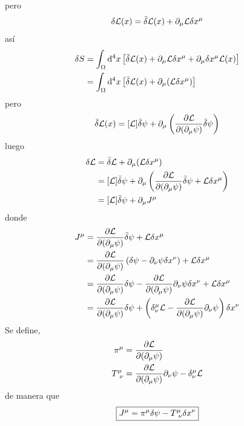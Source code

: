 pero
\begin{equation}
  \delta\mathcal{L}(x)=\bar{\delta}\mathcal{L}(x)+\partial_\mu \mathcal{L}\delta x^\mu 
\end{equation}
así
\begin{align}
  \delta S&=\int_\Omega\dd^4x\left[\bar{\delta}\mathcal{L}(x)+\partial_\mu \mathcal{L}\delta x^\mu +\partial_\mu \delta x^\mu \mathcal{L}(x)\right]\\
  &=\int_\Omega\dd^4x \left[\bar{\delta} \mathcal{L}(x)+\partial_\mu (\mathcal{L} \delta x^\mu )\right]
\end{align}
pero
\begin{align}
  \bar{\delta} \mathcal{L}(x)=[\mathcal{L} ]\bar{\delta}\psi +\partial_\mu \left(\pdv{\mathcal{L}}{(\partial_\mu\psi)}\bar{\delta} \psi\right)
\end{align}
luego
\begin{align}
  \delta\mathcal{L} &=\bar{\delta} \mathcal{L} +\partial_\mu (\mathcal{L} \delta x^\mu )\\
  &=[\mathcal{L} ]\bar{\delta}\psi+\partial_\mu \left(\pdv{\mathcal{L}}{(\partial_\mu\psi)}\bar{\delta} \psi+\mathcal{L} \delta x^\mu\right)\\
  &=[\mathcal{L} ]\bar{\delta} \psi +\partial_\mu J^\mu 
\end{align}
donde 
\begin{align}
  J^\mu &=\pdv{\mathcal{L}}{(\partial_\mu\psi)}\bar{\delta} \psi+\mathcal{L} \delta x^\mu\\
  &=\pdv{\mathcal{L}}{(\partial_\mu\psi)}\left(\delta \psi-\partial_\nu \psi\delta x^\nu \right)+\mathcal{L} \delta x^\mu \\
  &=\pdv{\mathcal{L}}{(\partial_\mu\psi)}\delta\psi -\pdv{\mathcal{L}}{(\partial_\mu\psi)}\partial_\nu \psi\delta x^\nu +\mathcal{L} \delta x^\mu \\
  &=\pdv{\mathcal{L}}{(\partial_\mu\psi)}\delta\psi +\left(\delta^\mu_\nu \mathcal{L} -\pdv{\mathcal{L}}{(\partial_\mu\psi)}\partial_\nu \psi\right)\delta x^\nu 
\end{align}
Se define,
\begin{align}
  \pi^\mu &=\pdv{\mathcal{L}}{(\partial_\mu\psi)}\\
  T^\mu _{~\nu }&=\pdv{\mathcal{L}}{(\partial_\mu\psi)}\partial_\nu \psi-\delta^\mu_\nu \mathcal{L} 
\end{align}
de manera que
\begin{equation}
 \boxed{ J^\mu =\pi^\mu \delta\psi- T^\mu _{~\nu }\delta x^\nu }
\end{equation}

